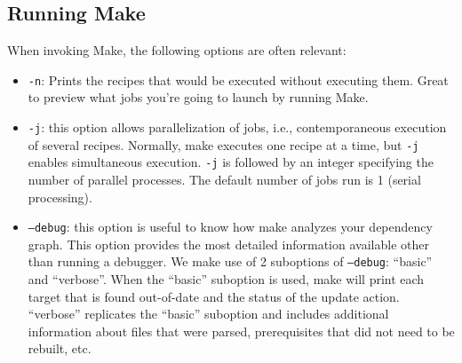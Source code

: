 \subsection{Running Make}
When invoking Make, the following options are often relevant:
\begin{itemize}
	\item \texttt{-n}: Prints the recipes that would be executed without executing them. Great to preview what jobs you're going to launch by running Make.
	\item \texttt{-j}: this option allows parallelization of jobs, i.e., contemporaneous execution of several recipes.
	Normally, make executes one recipe at a time, but \texttt{-j} enables simultaneous execution.
	\texttt{-j} is followed by an integer specifying the number of parallel processes.
	The default number of jobs run is 1 (serial processing).
	\item \texttt{--debug}: this option is useful to know how make analyzes your dependency graph. This option provides the most detailed information available other than running a debugger.
	We make use of 2 suboptions of \texttt{--debug}: ``basic'' and ``verbose''.
	When the ``basic'' suboption is used, make will print each target that is found out-of-date and the status of the update action.
	``verbose'' replicates the ``basic'' suboption and includes additional information about files that were parsed, prerequisites that did not need to be rebuilt, etc.
\end{itemize}

